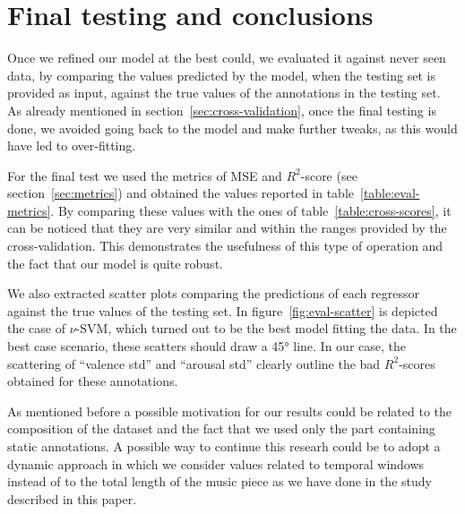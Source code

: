 \section{Final testing and conclusions}\label{sec:conclusions}

Once we refined our model at the best could, we evaluated it against never seen data, by comparing the values predicted by the model, when the testing set is provided as input, against the true values of the annotations in the testing set. As already mentioned in section~\ref{sec:cross-validation}, once the final testing is done, we avoided going back to the model and make further tweaks, as this would have led to over-fitting.

For the final test we used the metrics of MSE and $R^2$-score (see section~\ref{sec:metrics}) and obtained the values reported in table~\ref{table:eval-metrics}. By comparing these values with the ones of table~\ref{table:cross-scores}, it can be noticed that they are very similar and within the ranges provided by the cross-validation. This demonstrates the usefulness of this type of operation and the fact that our model is quite robust.


We also extracted scatter plots comparing the predictions of each regressor against the true values of the testing set. In  figure~\ref{fig:eval-scatter} is depicted the case of $\nu$-SVM, which turned out to be the best model fitting the data. In the best case scenario, these scatters should draw a 45° line. In our case, the scattering of ``valence std'' and ``arousal std'' clearly outline the bad $R^2$-scores obtained for these annotations.

As mentioned before a possible motivation for our results could be related to the composition of the dataset and the fact that we used only the part containing static annotations. A possible way to continue this researh could be to adopt a dynamic approach in which we consider values related to temporal windows instead of to the total length of the music piece as we have done in the study described in this paper. 


